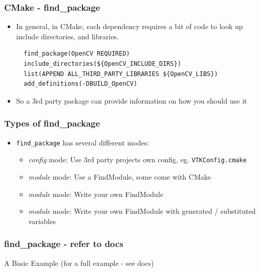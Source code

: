 \subsubsection{CMake - find\_package}\label{cmake---findux5fpackage}

\begin{itemize}
\item
  In general, in CMake, each dependency requires a bit of code to look
  up include directories, and libraries.

\begin{verbatim}
  find_package(OpenCV REQUIRED)
  include_directories(${OpenCV_INCLUDE_DIRS})
  list(APPEND ALL_THIRD_PARTY_LIBRARIES ${OpenCV_LIBS})
  add_definitions(-DBUILD_OpenCV)
\end{verbatim}
\item
  So a 3rd party package can provide information on how you should use
  it
\end{itemize}

\subsubsection{Types of find\_package}\label{types-of-findux5fpackage}

\begin{itemize}
\itemsep1pt\parskip0pt
\item
  \texttt{find\_package} has several different modes:

  \begin{itemize}
  \itemsep1pt\parskip0pt
  \item
    \emph{config} mode: Use 3rd party projects own config, eg.
    \texttt{VTKConfig.cmake}
  \item
    \emph{module} mode: Use a FindModule, some come with CMake
  \item
    \emph{module} mode: Write your own FindModule
  \item
    \emph{module} mode: Write your own FindModule with generated /
    substituted variables
  \end{itemize}
\end{itemize}

\subsubsection{find\_package - refer to
docs}\label{findux5fpackage---refer-to-docs}

A Basic Example (for a full example - see docs)

